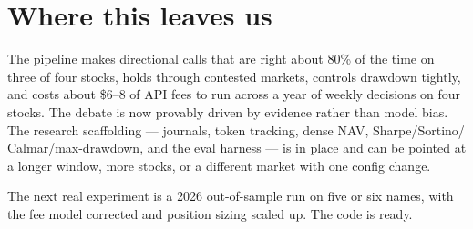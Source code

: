 \documentclass[11pt,a4paper]{article}
\begin{document}
\section{Where this leaves us}

The pipeline makes directional calls that are right about 80\% of the
time on three of four stocks, holds through contested markets, controls
drawdown tightly, and costs about \$6--8 of API fees to run across a
year of weekly decisions on four stocks. The debate is now
provably driven by evidence rather than model bias. The research
scaffolding --- journals, token tracking, dense NAV, Sharpe/Sortino/
Calmar/max-drawdown, and the eval harness --- is in place and can be
pointed at a longer window, more stocks, or a different market with
one config change.

The next real experiment is a 2026 out-of-sample run on five or six
names, with the fee model corrected and position sizing scaled up. The
code is ready.
\end{document}
